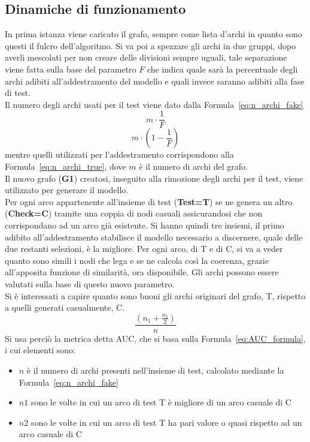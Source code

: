\subsection{Dinamiche di funzionamento}
In prima istanza viene caricato il grafo, sempre come lista d'archi in quanto sono questi il fulcro dell'algoritmo. Si va poi a spezzare gli archi in due gruppi, dopo averli mescolati per non creare delle divisioni sempre uguali, tale separazione viene fatta sulla base del parametro $F$ che indica quale sarà la percentuale degli archi adibiti all'addestramento del modello e quali invece saranno adibiti alla fase di test.\\
Il numero degli archi usati per il test viene dato dalla Formula~\ref{eq:n_archi_fake}
\begin{equation}
	m \cdot \frac{1}{F}
	\label{eq:n_archi_fake}
\end{equation} 
\begin{equation}
	m \cdot \left( 1- \frac{1}{F} \right)
	\label{eq:n_archi_true}
\end{equation}
mentre quelli utilizzati per l'addestramento corrispondono alla Formula~\ref{eq:n_archi_true}, dove $m$ è il numero di archi del grafo.\\
Il nuovo grafo (\textbf{G1}) creatosi, inseguito alla rimozione degli archi per il test, viene utilizzato per generare il modello.\\
Per ogni arco appartenente all'insieme di test (\textbf{Test=T}) se ne genera un altro (\textbf{Check=C}) tramite una coppia di nodi casuali assicurandosi che non corrispondano ad un arco già esistente. Si hanno quindi tre insiemi, il primo adibito all'addestramento stabilisce il modello necessario a discernere, quale delle due restanti selezioni, è la migliore.
Per ogni arco, di T e di C, si va a veder quanto sono simili i nodi che lega e se ne calcola così la coerenza, grazie all'apposita funzione di similarità, ora disponibile. Gli archi possono essere valutati sulla base di questo nuovo parametro.\\
Si è interessati a capire quanto sono buoni gli archi originari del grafo, T, rispetto a quelli generati casualmente, C. 
\begin{equation}
	\frac{\left( n_1 + \frac{n_2}{2} \right)}{n}
	\label{eq:AUC_formula}
\end{equation}
Si usa perciò la metrica detta AUC\cite{AUC_metric}, che si basa sulla Formula~\ref{eq:AUC_formula}, i cui elementi sono:
\begin{itemize}
	\item $n$ è il numero di archi presenti nell'insieme di test, calcolato mediante la Formula~\ref{eq:n_archi_fake}
	\item $n1$ sono le volte in cui un arco di test T è migliore di un arco casuale di C
	\item $n2$ sono le volte in cui un arco di test T ha pari valore o quasi rispetto ad un arco casuale di C
\end{itemize}
